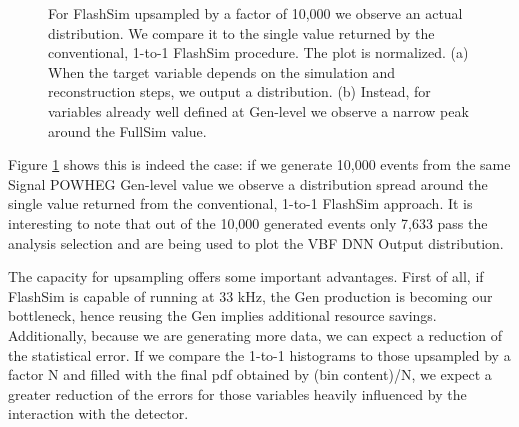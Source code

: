     \begin{figure}
   \myfloatalign
    \caption[Upsampling]{For FlashSim upsampled by a factor of 10,000 we observe an actual distribution. We compare it to the single value returned by the conventional, 1-to-1 FlashSim procedure. The plot is normalized. (a) When the target variable depends on the simulation and reconstruction steps, we output a distribution. (b) Instead, for variables already well defined at Gen-level we observe a narrow peak around the FullSim value.}
    \label{fig:1upHMM}
   \end{figure}
   
   Figure \ref{fig:1upHMM} shows this is indeed the case: if we generate 10,000 events from the same Signal POWHEG Gen-level value we observe a distribution spread around the single value returned from the conventional, 1-to-1 FlashSim approach. It is interesting to note that out of the 10,000 generated events only 7,633 pass the analysis selection and are being used to plot the VBF DNN Output distribution.
   
   The capacity for upsampling offers some important advantages. First of all, if FlashSim is capable of running at 33 kHz, the Gen production is becoming our bottleneck, hence reusing the Gen implies additional resource savings. Additionally, because we are generating more data, we can expect a reduction of the statistical error. If we compare the 1-to-1 histograms to those upsampled by a factor N and filled with the final pdf obtained by (bin content)/N, we expect a greater reduction of the errors for those variables heavily influenced by the interaction with the detector.
   
